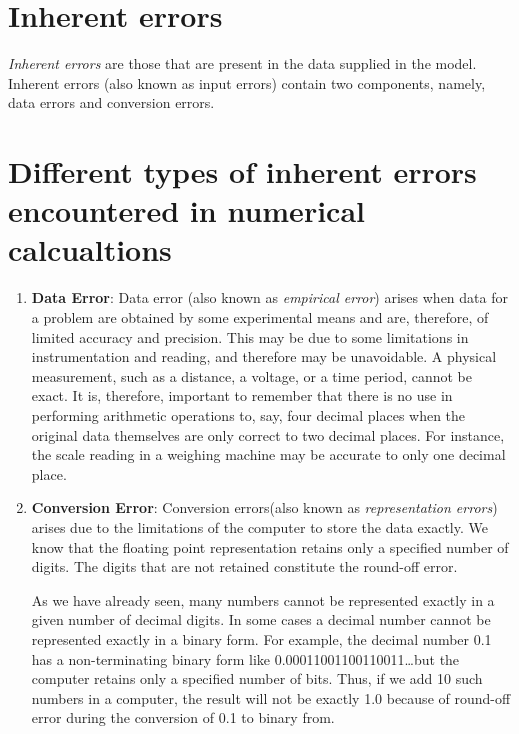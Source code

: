 \documentclass[11pt, a4paper, oneside]{book}
\begin{document}
        \section{Inherent errors}
          \textit{Inherent errors} are those that are present in the data supplied in 
          the model. Inherent errors (also known as input errors) contain two components, namely, data errors
          and conversion errors.



        \section{Different types of inherent errors encountered in numerical calcualtions}
        \begin{enumerate}
          \item \textbf{Data Error}: Data error (also known as \textit{empirical error}) arises when data for a
            problem are obtained by some experimental means and are, therefore, of limited accuracy and precision.
            This may be due to some limitations in instrumentation and reading, and therefore may be unavoidable.
            A physical measurement, such as a distance, a voltage, or a time period, cannot be exact. It is, therefore,
            important to remember that there is no use in performing arithmetic operations to, say, four decimal
            places when the original data themselves are only correct to two decimal places. For instance, the scale
            reading in a weighing machine may be accurate to only one decimal place.

          \item \textbf{Conversion Error}: Conversion errors(also known as \textit{representation errors})
            arises due to the limitations of the computer to store the data exactly. We know that the floating
            point representation retains only a specified number of digits. The digits that are not retained
            constitute the round-off error.

            As we have already seen, many numbers  cannot be represented exactly in a given number of decimal digits.
            In some cases a decimal number cannot be represented exactly in a binary form. For example, the decimal
            number 0.1 has a non-terminating binary form like 0.00011001100110011\dots but the computer retains only
            a specified number of bits. Thus, if we add 10 such numbers in a computer, the result will not be exactly
            1.0 because of round-off error during the conversion of 0.1 to binary from.

        \end{enumerate}
\end{document}
